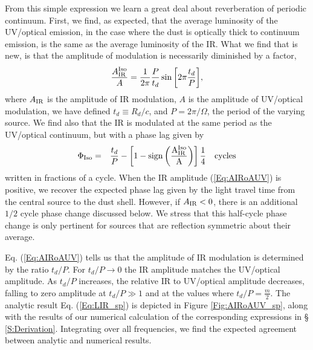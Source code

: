 From this simple expression we learn a great deal about reverberation of
periodic continuum. First, we find, as expected, that the average luminosity
of the UV/optical emission, in the case where the dust is optically thick to
continuum emission, is the same as the average luminosity of the IR. 
What we find that is new, is that the amplitude of modulation is
necessarily diminished by a factor,
\begin{eqnarray}
\frac{A^{\rm{Iso}}_{\rm{IR}}}{A} = \frac{1}{2 \pi}\frac{P}{t_d} \sin{\left[ 2 \pi\frac{t_d}{P} \right]},
\label{Eq:AIRoAUV}
\end{eqnarray}
where $A_{\rm{IR}}$ is the amplitude of IR modulation, $A$ is the amplitude of
UV/optical modulation, we have defined $t_d \equiv R_d/c$, and $P = 2 \pi
/\Omega$, the period of the varying source.  We find also that the IR is
modulated at the same period as the UV/optical continuum, but with a phase lag
given by
\begin{eqnarray}
\Phi_{\rm{Iso}} &=& \frac{t_d}{P} -  \left[1 - \rm{sign}\left(\frac{A^{\rm{Iso}}_{\rm{IR}}}{A}\right) \right] \frac{1}{4}  \quad \rm{cycles}
\label{Eq:ISOLags}
\end{eqnarray}
written in fractions of a cycle. When the IR amplitude (\ref{Eq:AIRoAUV}) is
positive, we recover the expected phase lag given by the light travel time
from the central source to the dust shell. However, if $A_{\rm{IR}} < 0$, there
is an additional $1/2$ cycle phase change discussed below. We stress that this
half-cycle phase change is only pertinent for sources that are reflection 
symmetric about their average.




Eq. (\ref{Eq:AIRoAUV}) tells us that the amplitude of IR modulation is
determined by the ratio $t_d/P$. For $t_d/P \rightarrow 0$ the IR amplitude
matches the UV/optical amplitude. As $t_d/P$ increases, the relative IR to
UV/optical amplitude decreases, falling to  zero amplitude at $t_d/P  \gg 1$
and at the values where $t_d/P = \frac{m}{2}$. The analytic result Eq.
(\ref{Eq:LIR_sp}) is depicted in Figure \ref{Fig:AIRoAUV_sp}, along with the
results of our numerical calculation of the corresponding expressions in \S
\ref{S:Derivation}. Integrating over all frequencies, we find the expected
agreement between analytic and numerical results.






